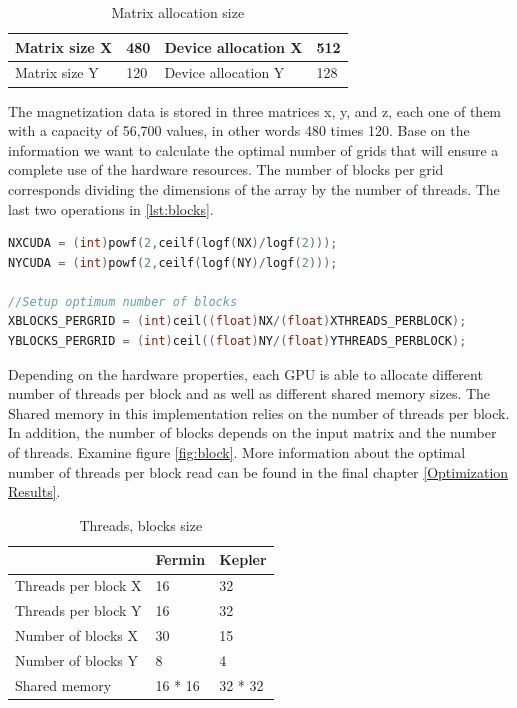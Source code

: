 \begin{table}[h]
\centering
\begin{tabular}{| l | l | l | l | }
\hline
Matrix size X & 480 & Device allocation X & 512\\
\hline
Matrix size Y & 120 & Device allocation Y & 128 \\
\hline
\end{tabular}
\caption{Matrix allocation size}
\label{tab:cuda}
\end{table}

The magnetization data is stored in three matrices x, y, and z, each one of them with a capacity of 56,700 values, in other words 480 times 120. Base on the information we want to calculate the optimal number of grids that will ensure a complete use of the hardware resources. The number of blocks per grid corresponds dividing the dimensions of the array by the number of threads. The last two operations in \ref{lst:blocks}.

\begin{lstlisting}[language=C++, label={lst:blocks}, caption={Device capacity calculation and number of block per grid}]	
NXCUDA = (int)powf(2,ceilf(logf(NX)/logf(2)));
NYCUDA = (int)powf(2,ceilf(logf(NY)/logf(2)));

//Setup optimum number of blocks
XBLOCKS_PERGRID = (int)ceil((float)NX/(float)XTHREADS_PERBLOCK); 
YBLOCKS_PERGRID = (int)ceil((float)NY/(float)YTHREADS_PERBLOCK);
\end{lstlisting}

Depending on the hardware properties, each GPU is able to allocate different number of threads per block and as well as different shared memory sizes. The Shared memory in this implementation relies on the number of threads per block. In addition, the number of blocks depends on the input matrix and the number of threads. Examine figure \ref{fig:block}. More information about the optimal number of threads per block read can be found in the final chapter \ref{Optimization Results}. 

\begin{table}[h]
\centering
\begin{tabular}{| l | l | l |}
\hline
 & Fermin & Kepler \\
\hline
Threads per block X  & 16 & 32 \\
\hline
Threads per block Y  & 16 & 32 \\
\hline
Number of blocks X & 30 & 15 \\
\hline
Number of blocks Y & 8 & 4 \\
\hline
Shared memory & 16 * 16 & 32 * 32 \\
\hline
\end{tabular}
\caption{Threads, blocks size}
\label{tab:threads}
\end{table}


